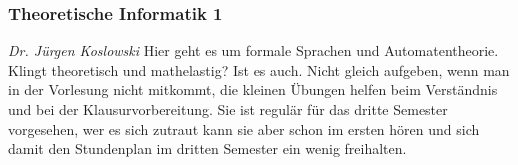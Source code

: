 \subsubsection{Theoretische Informatik 1}
	\textit{Dr. Jürgen Koslowski}
	Hier geht es um formale Sprachen und Automatentheorie. Klingt theoretisch und mathelastig? Ist es auch. Nicht gleich aufgeben, wenn man in der Vorlesung nicht mitkommt, die kleinen Übungen helfen beim Verständnis und bei der Klausurvorbereitung. Sie ist regulär für das dritte Semester vorgesehen, wer es sich zutraut kann sie aber schon im ersten hören und sich damit den Stundenplan im dritten Semester ein wenig freihalten. 